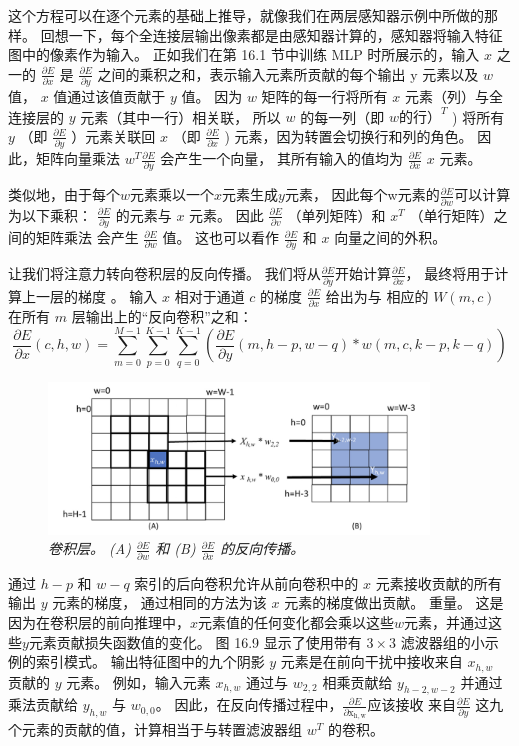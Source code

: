 这个方程可以在逐个元素的基础上推导，就像我们在两层感知器示例中所做的那样。 
回想一下，每个全连接层输出像素都是由感知器计算的，感知器将输入特征图中的像素作为输入。 
正如我们在第 16.1 节中训练 MLP 时所展示的，输入 $x$ 之一的 $\frac{\partial E}{\partial x}$ 
是 $\frac{\partial E}{\partial y}$ 之间的乘积之和，表示输入元素所贡献的每个输出 $\mathrm{y}$ 元素以及 $w$ 值，
$x$ 值通过该值贡献于 $y$ 值。 因为 $w$ 矩阵的每一行将所有 $x$ 元素（列）与全连接层的 $y$ 元素（其中一行）相关联，
所以 $w$ 的每一列（即 $w 的行） ^{T}$ ) 将所有 $y$ （即 $\frac{\partial E}{\partial y}$ ）元素关联回 $x$ （即 $\frac{\partial E}{\partial x}$ ) 元素，因为转置会切换行和列的角色。 
因此，矩阵向量乘法 $w^{T} \frac{\partial E}{\partial y}$ 会产生一个向量，
其所有输入的值均为 $\frac{\partial E}{\partial x}$ $x$ 元素。

类似地，由于每个$w$元素乘以一个$x$元素生成$y$元素，
因此每个w元素的$\frac{\partial E}{\partial w}$可以计算为以下乘积： 
$\frac{\partial E}{\partial y}$ 的元素与 $x$ 元素。 
因此 $\frac{\partial E}{\partial v}$ （单列矩阵）和 $x^{T}$ （单行矩阵）之间的矩阵乘法
会产生 $\frac{\partial E}{\partial w}$ 值。 
这也可以看作 $\frac{\partial E}{\partial y}$ 和 $x$ 向量之间的外积。

让我们将注意力转向卷积层的反向传播。 
我们将从$\frac{\partial E}{\partial y}$开始计算$\frac{\partial E}{\partial x}$，
最终将用于计算上一层的梯度 。 
输入 $x$ 相对于通道 $c$ 的梯度 $\frac{\partial E}{\partial x}$ 给出为与
相应的 $W(m, c) $ 在所有 $m$ 层输出上的“反向卷积”之和：
$$
\frac{\partial E}{\partial x}(c, h, w)=\sum_{m=0}^{M-1} \sum_{p=0}^{K-1} \sum_{q =0}^{K-1}\left(\frac{\partial E}{\partial y}(m, h-p, w-q) * w(m, c, k-p, k-q)\right)
$$

\begin{figure}[H]
	\centering
	\includegraphics[width=0.9\textwidth]{figs/F16.9.png}
	\caption{\textit{卷积层。 (A) $\frac{\partial E}{\partial w}$ 
	和 (B) $\frac{\partial E}{\partial x}$ 的反向传播。}}
\end{figure}

通过 $h-p$ 和 $w-q$ 索引的后向卷积允许从前向卷积中的 $x$ 元素接收贡献的所有输出 $y$ 元素的梯度，
通过相同的方法为该 $x$ 元素的梯度做出贡献。 重量。 
这是因为在卷积层的前向推理中，$x$元素值的任何变化都会乘以这些$w$元素，并通过这些$y$元素贡献损失函数值的变化。 
图 16.9 显示了使用带有 $3 \times 3$ 滤波器组的小示例的索引模式。 
输出特征图中的九个阴影 $y$ 元素是在前向干扰中接收来自 $x_{h, w}$ 贡献的 $y$ 元素。 
例如，输入元素 $x_{h, w}$ 通过与 $w_{2,2}$ 相乘贡献给 $y_{h-2, w-2}$ 并通过乘法贡献给 $y_{h, w}$ 与 $w_{0,0}$。 
因此，在反向传播过程中，$\frac{\partial E}{\partial \mathrm{x}_{\mathrm{h}, \mathrm{w}}}$应该接收
来自$\frac{\partial E}{\partial y}$ 这九个元素的贡献的值，计算相当于与转置滤波器组 $w^{T}$ 的卷积。

